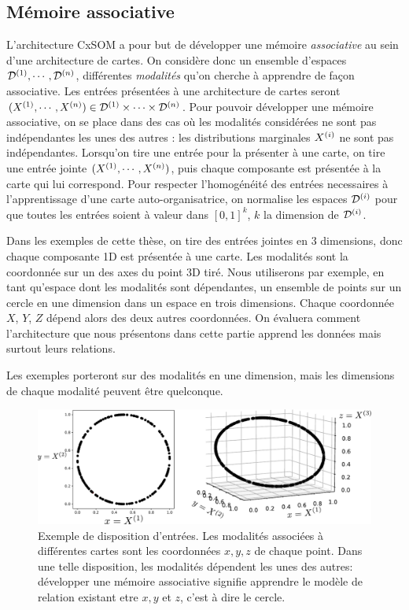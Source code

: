 \subsection{Mémoire associative}
L'architecture CxSOM a pour but de développer une mémoire \emph{associative} au sein d'une architecture de cartes. On considère donc un ensemble d'espaces $\mathcal{D}^{({1})}, \cdots , \mathcal{D}^{({n})}$, différentes \emph{modalités} qu'on cherche à apprendre de façon associative. Les entrées présentées à une architecture de cartes seront $(X^{({1})}, \cdots, X^{({n})}) \in \mathcal{D}^{({1})} \times \cdots \times \mathcal{D}^{({n})}$. Pour pouvoir développer une mémoire associative, on se place dans des cas où les modalités considérées ne sont pas indépendantes les unes des autres : les distributions marginales $X^{({i})}$ ne sont pas indépendantes. Lorsqu'on tire une entrée pour la présenter à une carte, on tire une entrée jointe $(X^{({1})}, \cdots , X^{({n})})$, puis chaque composante est présentée à la carte qui lui correspond. Pour respecter l'homogénéité des entrées necessaires à l'apprentissage d'une carte auto-organisatrice, on normalise les espaces $\mathcal{D}^{({i})}$ pour que toutes les entrées soient à valeur dans $[0,1]^k$, $k$ la dimension de $\mathcal{D}^{({i})}$.

Dans les exemples de cette thèse, on tire des entrées jointes en 3 dimensions, donc chaque composante 1D est présentée à une carte. Les modalités sont la coordonnée sur un des axes du point 3D tiré. Nous utiliserons par exemple, en tant qu'espace dont les modalités sont dépendantes, un ensemble de points sur un cercle en une dimension dans un espace en trois dimensions. Chaque coordonnée $X$, $Y$, $Z$ dépend alors des deux autres coordonnées. On évaluera comment l'architecture que nous présentons dans cette partie apprend les données mais surtout leurs relations. 

Les exemples porteront sur des modalités en une dimension, mais les dimensions de chaque modalité peuvent être quelconque.

\begin{figure}
\centering
\includegraphics[width=\textwidth]{inputs_3som}
\caption{Exemple de disposition d'entrées. Les modalités associées à différentes cartes sont les coordonnées $x,y,z$ de chaque point. Dans une telle disposition, les modalités dépendent les unes des autres: développer une mémoire associative signifie apprendre le modèle de relation existant etre $x,y$ et $z$, c'est à dire le cercle.}
\label{fig:inputs}
\end{figure}


